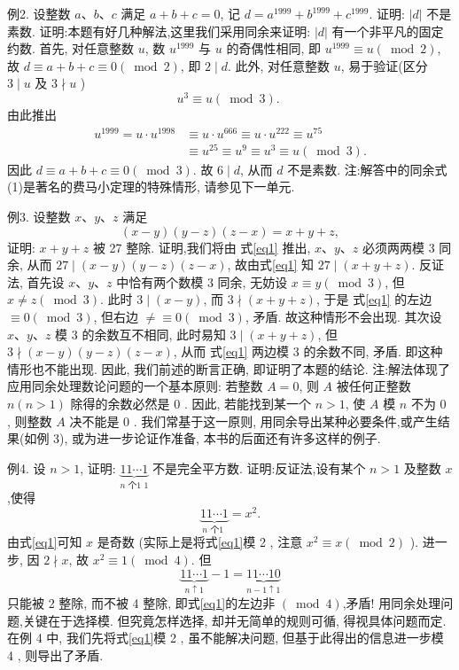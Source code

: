 例2. 设整数 $a 、 b 、 c$ 满足 $a+b+c=0$, 记 $d=a^{1999}+b^{1999}+c^{1999}$. 证明: $|d|$ 不是素数.
证明:本题有好几种解法,这里我们采用同余来证明: $|d|$ 有一个非平凡的固定约数.
首先, 对任意整数 $u$, 数 $u^{1999}$ 与 $u$ 的奇偶性相同, 即 $u^{1999} \equiv u(\bmod 2)$, 故 $d \equiv a+b+c \equiv 0(\bmod 2)$, 即 $2 \mid d$.
此外, 对任意整数 $u$, 易于验证(区分 $3 \mid u$ 及 $3 \nmid u$ )
$$
u^3 \equiv u(\bmod 3) \text {. } \label{eq1}
$$
由此推出
$$
\begin{aligned}
u^{1999}=u \cdot u^{1998} & \equiv u \cdot u^{666} \equiv u \cdot u^{222} \equiv u^{75} \\
& \equiv u^{25} \equiv u^9 \equiv u^3 \equiv u(\bmod 3) .
\end{aligned}
$$
因此 $d \equiv a+b+c \equiv 0(\bmod 3)$. 故 $6 \mid d$, 从而 $d$ 不是素数.
注:解答中的同余式(1)是著名的费马小定理的特殊情形, 请参见下一单元.



例3. 设整数 $x 、 y 、 z$ 满足
$$
(x-y)(y-z)(z-x)=x+y+z, \label{eq1}
$$
证明: $x+y+z$ 被 27 整除.
证明,我们将由 式\ref{eq1} 推出, $x 、 y 、 z$ 必须两两模 3 同余, 从而 $27 \mid(x-y) (y-z)(z-x)$, 故由式\ref{eq1} 知 $27 \mid(x+y+z)$.
反证法, 首先设 $x 、 y 、 z$ 中恰有两个数模 3 同余, 无妨设 $x \equiv y(\bmod 3)$, 但 $x \neq z(\bmod 3)$. 此时 $3 \mid(x-y)$, 而 $3 \nmid(x+y+z)$, 于是 式\ref{eq1} 的左边 $\equiv 0(\bmod 3)$, 但右边 $\neq \equiv 0(\bmod 3)$, 矛盾.
故这种情形不会出现.
其次设 $x 、 y 、 z$ 模 3 的余数互不相同, 此时易知 $3 \mid(x+y+z)$, 但 $3 \nmid(x-y)(y-z)(z-x)$, 从而 式\ref{eq1}  两边模 3 的余数不同, 矛盾.
即这种情形也不能出现.
因此, 我们前述的断言正确, 即证明了本题的结论.
注:解法体现了应用同余处理数论问题的一个基本原则: 若整数 $A=0$, 则 $A$ 被任何正整数 $n(n>1)$ 除得的余数必然是 0 . 因此, 若能找到某一个 $n>1$, 使 $A$ 模 $n$ 不为 0 , 则整数 $A$ 决不能是 0 . 我们常基于这一原则, 用同余导出某种必要条件,或产生结果(如例 3), 或为进一步论证作准备, 本书的后面还有许多这样的例子.



例4. 设 $n>1$, 证明: $\underbrace{11 \cdots 1}_{n \text { 个1 } 1}$ 不是完全平方数.
证明:反证法,设有某个 $n>1$ 及整数 $x$,使得
$$
\underbrace{11 \cdots 1}_{n \text { 个1 }}=x^2 . \label{eq1}
$$
由式\ref{eq1}可知 $x$ 是奇数 (实际上是将式\ref{eq1}模 2 , 注意 $x^2 \equiv x(\bmod 2)$ ). 进一步, 因 $2 \nmid x$, 故 $x^2 \equiv 1(\bmod 4)$. 但
$$
\underbrace{11 \cdots 1}_{n \uparrow 1}-1=\underbrace{11 \cdots 10}_{n-1 \uparrow 1}
$$
只能被 2 整除, 而不被 4 整除, 即式\ref{eq1}的左边非 $(\bmod 4)$,矛盾!
用同余处理问题,关键在于选择模.
但究竟怎样选择, 却并无简单的规则可循, 得视具体问题而定.
在例 4 中, 我们先将式\ref{eq1}模 2 , 虽不能解决问题, 但基于此得出的信息进一步模 4 , 则导出了矛盾.



